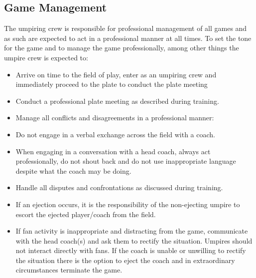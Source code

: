 \documentclass[letterpaper,11pt,colorlinks=true,allcolors=blue]{article}
\begin{document}
\subsection*{Game Management}
The umpiring crew is responsible for professional management of all games and as such are expected to act in a professional manner at all times. To set the tone for the game and to manage the game professionally, among other things the umpire crew is expected to:
\begin{itemize}
\item  Arrive on time to the field of play, enter as an umpiring crew and immediately proceed to the plate to conduct the plate meeting
\item  Conduct a professional plate meeting as described during training.
\item  Manage all conflicts and disagreements in a professional manner:
\item  Do not engage in a verbal exchange across the field with a coach.
\item  When engaging in a conversation with a head coach, always act professionally, do not shout back and do not use inappropriate language despite what the coach may be doing.
\item  Handle all disputes and confrontations as discussed during training.
\item  If an ejection occurs, it is the responsibility of the non-ejecting umpire to escort the ejected player/coach from the field.
\item  If fan activity is inappropriate and distracting from the game, communicate with the head coach(s) and ask them to rectify the situation. Umpires should not interact directly with fans. If the coach is unable or unwilling to rectify the situation there is the option to eject the coach and in extraordinary circumstances terminate the game.
\end{itemize}
\end{document}
